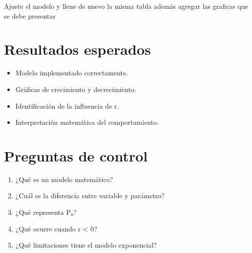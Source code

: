 \documentclass[11pt,a4paper]{article}
\begin{document}
Ajuste el modelo y llene de nuevo la misma tabla además agregar las graficas que
se debe presentar

\section{Resultados esperados}
\begin{itemize}
    \item Modelo implementado correctamente.
    \item Gráficas de crecimiento y decrecimiento.
    \item Identificación de la influencia de r.
    \item Interpretación matemática del comportamiento.
\end{itemize}

\section{Preguntas de control}
\begin{enumerate}
    \item ¿Qué es un modelo matemático?
    \item ¿Cuál es la diferencia entre variable y parámetro?
    \item ¿Qué representa P₀?
    \item ¿Qué ocurre cuando r < 0?
    \item ¿Qué limitaciones tiene el modelo exponencial?
\end{enumerate}
\end{document}
